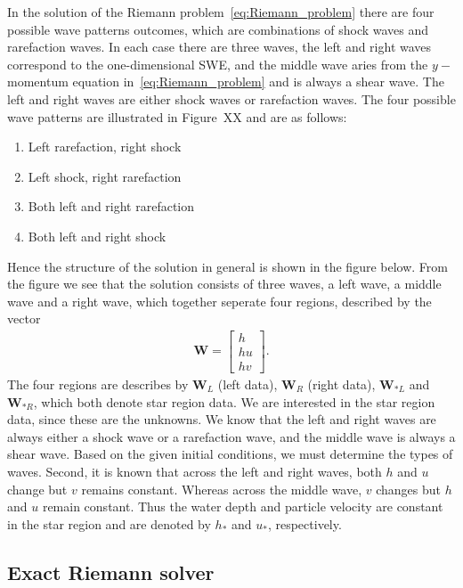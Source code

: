 In the solution of the Riemann problem~\eqref{eq:Riemann_problem} there are four possible wave patterns outcomes, which are combinations of shock waves and rarefaction waves.
In each case there are three waves, the left and right waves correspond to the one-dimensional SWE, and the middle wave aries from the $y-$momentum equation in~\eqref{eq:Riemann_problem} and is always a shear wave.
The left and right waves are either shock waves or rarefaction waves.
The four possible wave patterns are illustrated in Figure~XX and are as follows:
\begin{enumerate}
    \item Left rarefaction, right shock
    \item Left shock, right rarefaction
    \item Both left and right rarefaction
    \item Both left and right shock
\end{enumerate}
Hence the structure of the solution in general is shown in the figure below.
From the figure we see that the solution consists of three waves, a left wave, a middle wave and a right wave, which together seperate four regions, described by the vector
\begin{align*}
\mathbf{W} = \begin{bmatrix}
    h \\ hu \\ hv
    \end{bmatrix}.
\end{align*}
The four regions are describes by $\mathbf{W}_L$ (left data), $\mathbf{W}_R$ (right data), $\mathbf{W}_{*L}$ and $\mathbf{W}_{*R}$, which both denote star region data.
We are interested in the star region data, since these are the unknowns.
We know that the left and right waves are always either a shock wave or a rarefaction wave, and the middle wave is always a shear wave.
Based on the given initial conditions, we must determine the types of waves.
Second, it is known that across the left and right waves, both $h$ and $u$ change but $v$ remains constant.
Whereas across the middle wave, $v$ changes but $h$ and $u$ remain constant.
Thus the water depth and particle velocity are constant in the star region and are denoted by $h_*$ and $u_*$, respectively.


\subsection{Exact Riemann solver}

